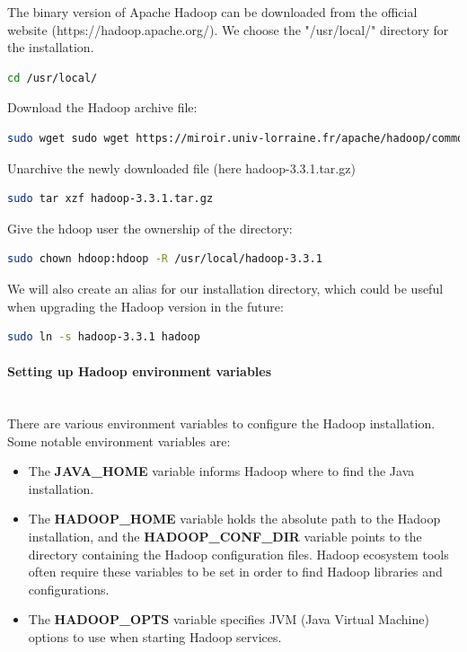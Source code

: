 \documentclass[12pt,english]{book}
\begin{document}
The binary version of Apache Hadoop can be downloaded from the official website (https://hadoop.apache.org/).
We choose the "/usr/local/" directory for the installation.
\begin{lstlisting}[language=bash, frame=single]
cd /usr/local/
\end{lstlisting}
Download the Hadoop archive file:
\begin{lstlisting}[language=bash, frame=single]
sudo wget sudo wget https://miroir.univ-lorraine.fr/apache/hadoop/common/hadoop-3.3.1/hadoop-3.3.1.tar.gz
\end{lstlisting}
Unarchive the newly downloaded file (here hadoop-3.3.1.tar.gz)
\begin{lstlisting}[language=bash, frame=single]
sudo tar xzf hadoop-3.3.1.tar.gz
\end{lstlisting}
Give the hdoop user the ownership of the directory:
\begin{lstlisting}[language=bash, frame=single]
sudo chown hdoop:hdoop -R /usr/local/hadoop-3.3.1
\end{lstlisting}
We will also create an alias for our installation directory, which could be useful when upgrading the Hadoop version in the future:
\begin{lstlisting}[language=bash, frame=single]
sudo ln -s hadoop-3.3.1 hadoop
\end{lstlisting}


\paragraph{Setting up Hadoop environment variables}\mbox{}\\


There are various environment variables to configure the Hadoop installation.
Some notable environment variables are:
\begin{itemize}
\item
The \textbf{JAVA\_HOME} variable informs Hadoop where to find the Java installation.

\item
The \textbf{HADOOP\_HOME} variable holds the absolute path to the Hadoop installation, and the \textbf{HADOOP\_CONF\_DIR} variable points to the directory containing the Hadoop configuration files.
Hadoop ecosystem tools often require these variables to be set in order to find Hadoop libraries and configurations.

\item
The \textbf{HADOOP\_OPTS}  variable specifies JVM (Java Virtual Machine) options to use when starting Hadoop services.

\end{itemize}
\end{document}
